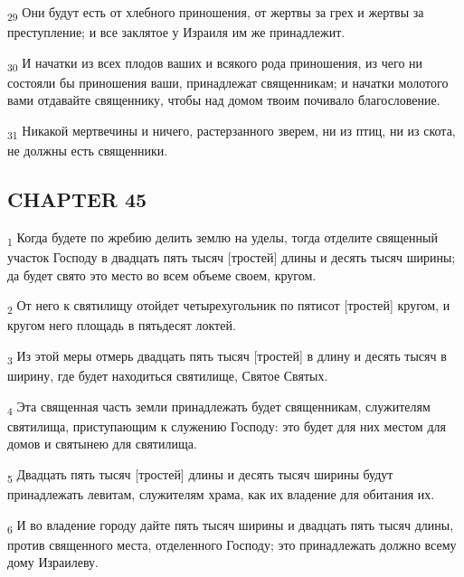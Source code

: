 \begin{tcolorbox}
\textsubscript{29} Они будут есть от хлебного приношения, от жертвы за грех и жертвы за преступление; и все заклятое у Израиля им же принадлежит.
\end{tcolorbox}
\begin{tcolorbox}
\textsubscript{30} И начатки из всех плодов ваших и всякого рода приношения, из чего ни состояли бы приношения ваши, принадлежат священникам; и начатки молотого вами отдавайте священнику, чтобы над домом твоим почивало благословение.
\end{tcolorbox}
\begin{tcolorbox}
\textsubscript{31} Никакой мертвечины и ничего, растерзанного зверем, ни из птиц, ни из скота, не должны есть священники.
\end{tcolorbox}
\subsection{CHAPTER 45}
\begin{tcolorbox}
\textsubscript{1} Когда будете по жребию делить землю на уделы, тогда отделите священный участок Господу в двадцать пять тысяч [тростей] длины и десять тысяч ширины; да будет свято это место во всем объеме своем, кругом.
\end{tcolorbox}
\begin{tcolorbox}
\textsubscript{2} От него к святилищу отойдет четырехугольник по пятисот [тростей] кругом, и кругом него площадь в пятьдесят локтей.
\end{tcolorbox}
\begin{tcolorbox}
\textsubscript{3} Из этой меры отмерь двадцать пять тысяч [тростей] в длину и десять тысяч в ширину, где будет находиться святилище, Святое Святых.
\end{tcolorbox}
\begin{tcolorbox}
\textsubscript{4} Эта священная часть земли принадлежать будет священникам, служителям святилища, приступающим к служению Господу: это будет для них местом для домов и святынею для святилища.
\end{tcolorbox}
\begin{tcolorbox}
\textsubscript{5} Двадцать пять тысяч [тростей] длины и десять тысяч ширины будут принадлежать левитам, служителям храма, как их владение для обитания их.
\end{tcolorbox}
\begin{tcolorbox}
\textsubscript{6} И во владение городу дайте пять тысяч ширины и двадцать пять тысяч длины, против священного места, отделенного Господу; это принадлежать должно всему дому Израилеву.
\end{tcolorbox}
